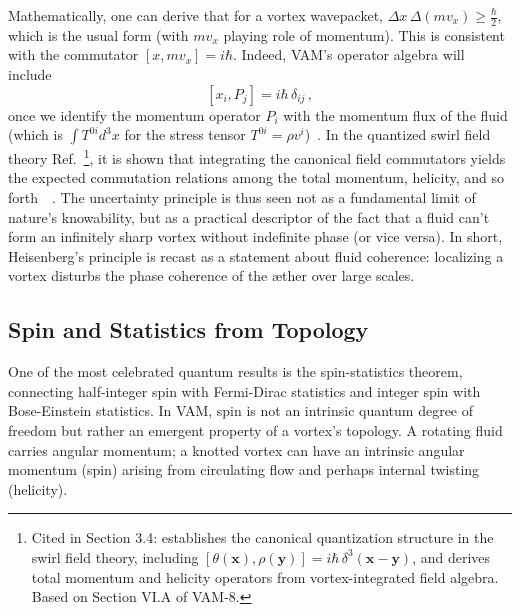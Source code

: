 \documentclass[a4paper,12pt]{article}
\begin{document}
    Mathematically, one can derive that for a vortex wavepacket, $\Delta x\, \Delta (m v_x) \ge \frac{\hbar}{2}$, which is the usual form (with $m v_x$ playing role of momentum). This is consistent with the commutator $[x, m v_x] = i\hbar$. Indeed, VAM’s operator algebra will include
    \[
        [x_i, P_j] = i\hbar\,\delta_{ij}\,,
    \]
    once we identify the momentum operator $P_i$ with the momentum flux of the fluid (which is $\int T^{0i} d^3x$ for the stress tensor $T^{0i} = \rho v^i$)~\cite{reference_76}. In the quantized swirl field theory Ref.~\cite{VAM8}\footnote{Cited in Section 3.4: establishes the canonical quantization structure in the swirl field theory, including $[\theta(\mathbf{x}), \rho(\mathbf{y})] = i\hbar\,\delta^3(\mathbf{x}-\mathbf{y})$, and derives total momentum and helicity operators from vortex-integrated field algebra. Based on Section VI.A of VAM-8.}, it is shown that integrating the canonical field commutators yields the expected commutation relations among the total momentum, helicity, and so forth~\cite{reference_77}~\cite{reference_78}. The uncertainty principle is thus seen not as a fundamental limit of nature’s knowability, but as a practical descriptor of the fact that a fluid can’t form an infinitely sharp vortex without indefinite phase (or vice versa). In short, Heisenberg’s principle is recast as a statement about fluid coherence: localizing a vortex disturbs the phase coherence of the æther over large scales.

    \subsection{Spin and Statistics from Topology}
    One of the most celebrated quantum results is the spin-statistics theorem, connecting half-integer spin with Fermi-Dirac statistics and integer spin with Bose-Einstein statistics. In VAM, spin is not an intrinsic quantum degree of freedom but rather an emergent property of a vortex’s topology. A rotating fluid carries angular momentum; a knotted vortex can have an intrinsic angular momentum (spin) arising from circulating flow and perhaps internal twisting (helicity).
\end{document}
